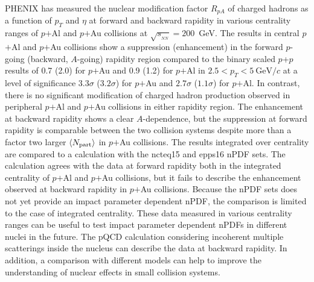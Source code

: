 \documentclass[twocolumn,letterpaper,aps,prc,longbibliography,superscriptaddress,nofootinbib,floatfix]{revtex4-2}
\newcommand{\pt}{\mbox{$p_T$}\xspace}
\newcommand{\rpa}{\mbox{$R_{pA}$}\xspace}
\newcommand{\npart}{\mbox{$\langle N_{\rm part} \rangle$}\xspace}
\newcommand{\sqsntwo}{\mbox{$\sqrt{s_{_{NN}}}=200$~GeV}\xspace}
\newcommand{\pp}{\mbox{$p$+$p$}\xspace}
\newcommand{\pau}{\mbox{$p$$+$Au}\xspace}
\newcommand{\pal}{\mbox{$p$$+$Al}\xspace}
\newcommand{\palau}{\mbox{$p$$+$Al and $p$$+$Au}\xspace}
\newcommand{\ncteq}{\mbox{n{\sc cteq15}}\xspace}
\newcommand{\epps}{\mbox{{\sc epps16}}\xspace}
\begin{document}
PHENIX has measured the nuclear modification factor \rpa of charged 
hadrons as a function of \pt and $\eta$ at forward and backward rapidity 
in various centrality ranges of \pal and \pau collisions at \sqsntwo. 
The results in central \pal and \pau collisions show a suppression (enhancement) in the forward $p$-going (backward, $A$-going) rapidity region compared to the binary scaled \pp results of 0.7 (2.0) for \pau and 0.9 (1.2) for \pal in $2.5<\pt<5~\mathrm{GeV}/c$ at a level of significance $3.3\sigma$ ($3.2\sigma$) for \pau and $2.7\sigma$ ($1.1\sigma$) for \pal. In contrast, there is no significant modification of charged hadron production observed in peripheral \pal and \pau collisions in either rapidity region.
The enhancement 
at backward rapidity shows a clear $A$-dependence, but the suppression 
at forward rapidity is comparable between the two collision systems 
despite more than a factor two larger \npart in \pau collisions. The 
results integrated over centrality are compared to a calculation with 
the \ncteq and \epps nPDF sets. The calculation agrees with the data 
at forward rapidity both in the integrated centrality of \pal and \pau 
collisions, but it fails to describe the enhancement observed at 
backward rapidity in \pau collisions. Because the nPDF sets does not yet 
provide an impact parameter dependent nPDF, the comparison is limited to 
the case of integrated centrality. These data measured in various 
centrality ranges can be useful to test impact parameter dependent nPDFs 
in different nuclei in the future. The pQCD calculation considering 
incoherent multiple scatterings inside the nucleus can describe the data 
at backward rapidity. In addition, a comparison with different models 
can help to improve the understanding of nuclear effects in small 
collision systems.


\end{document}
